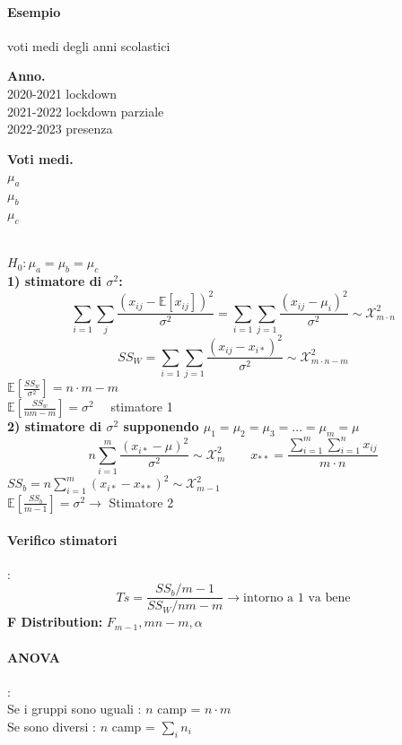 \documentclass[]{article}
\newcommand{\ev}{\mathbb{E}[X]}
\renewcommand{\ev}[1]{\mathbb{E}[#1]}
\begin{document}
    \paragraph{Esempio} voti medi degli anni scolastici \\[2ex]
    \begin{minipage}{0.45\textwidth}
        \textbf{Anno.} \\
        2020-2021 lockdown \\
        2021-2022 lockdown parziale \\
        2022-2023 presenza
    \end{minipage}
    \begin{minipage}{0.45\textwidth}
        \textbf{Voti medi.} \\
        $\mu_a$ \\
        $\mu_b$ \\
        $\mu_c$
    \end{minipage} \\[2ex]
    $H_0 : \mu_a = \mu_b = \mu_c$ \\[3ex]
    \textbf{1) stimatore di $\sigma^2$:} \\
    \[ \sum_{i=1}^{} \sum_{j}^{} \frac{(x_{ij} - \ev{x_{ij}})^2}{\sigma^2} = \sum_{i=1}^{} \sum_{j=1}^{} \frac{(x_{ij} - \mu_i)^2}{\sigma^2} \sim \mathcal{X}^2_{m\cdot n} \]
    \[ SS_W = \sum_{i=1}^{} \sum_{j=1}^{} \frac{(x_{ij} - x_{i*})^2}{\sigma^2} \sim \mathcal{X}^2_{m \cdot n - m} \]
    $\ev{\frac{SS_w}{\sigma^2}} = n \cdot m - m$ \\[2ex]
    $\ev{\frac{SS_w}{nm - m}} = \sigma^2 \quad$ stimatore 1 \\[4ex]
    \textbf{2) stimatore di $\sigma^2$ supponendo $\mu_1 = \mu_2 = \mu_3 = \ldots = \mu_m = \mu$}
    \[ n \sum_{i=1}^{m} \frac{(x_{i*} - \mu)^2}{\sigma^2} \sim \mathcal{X}^2_m \qquad x_{**} = \frac{\sum_{i=1}^{m} \sum_{i=1}^{n} x_{ij}}{m \cdot n} \]
    $SS_b = n \sum_{i = 1}^{m} (x_{i*} - x_{**})^2 \sim \mathcal{X}^2_{m-1}$ \\
    $\ev{\frac{SS_b}{m-1}} = \sigma^2 \rightarrow$ Stimatore 2
    \paragraph{Verifico stimatori}:
    \[ Ts = \frac{SS_b / m-1}{SS_W / nm - m} \rightarrow \text{intorno a 1 va bene}\]
    \textbf{F Distribution:} $F_{m-1}, mn - m, \alpha$
    \paragraph{ANOVA}: \\
    Se i gruppi sono uguali : $n $ camp = $n \cdot m$ \\
    Se sono diversi : $n $ camp = $\sum_{i}^{} n_i$
\end{document}
